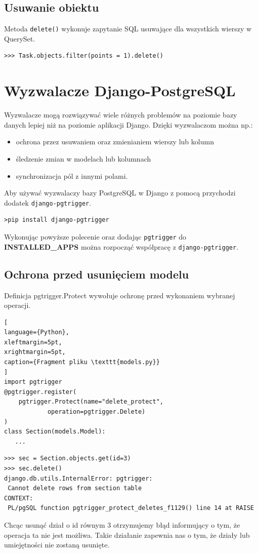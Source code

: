 \documentclass[oneside,polski,logo,indent]{amuthesis}
\begin{document}
\begin{enumerate}
\begin{enumerate}
\subsection{Usuwanie obiektu}
Metoda \texttt{delete()} wykonuje zapytanie SQL usuwające dla wszystkich wierszy w QuerySet.
\begin{lstlisting}[style=DOS]
>>> Task.objects.filter(points = 1).delete()
\end{lstlisting}
\section{Wyzwalacze Django-PostgreSQL}
Wyzwalacze mogą rozwiązywać wiele różnych problemów na poziomie bazy danych lepiej niż na poziomie aplikacji Django. Dzięki wyzwalaczom można np.:
\begin{itemize}
\item ochrona przez usuwaniem oraz zmienianiem wierszy lub kolumn
\item śledzenie zmian w modelach lub kolumnach
\item synchronizacja pól z innymi polami.
\end{itemize}
Aby używać wyzwalaczy bazy PostgreSQL w Django z pomocą przychodzi dodatek \texttt{django-pgtrigger}.
\begin{lstlisting}[style=DOS]
>pip install django-pgtrigger
\end{lstlisting}
Wykonując powyższe polecenie oraz dodając \texttt{pgtrigger} do \textbf{INSTALLED\_APPS} można rozpocząć współpracę z \texttt{django-pgtrigger}.
\subsection{Ochrona przed usunięciem modelu}
Definicja pgtrigger.Protect wywołuje ochronę przed wykonaniem wybranej operacji.
\begin{lstlisting}[
language={Python},
xleftmargin=5pt,
xrightmargin=5pt,
caption={Fragment pliku \texttt{models.py}}
]
import pgtrigger
@pgtrigger.register(
	pgtrigger.Protect(name="delete_protect",
			operation=pgtrigger.Delete)
)
class Section(models.Model):
   ...
\end{lstlisting}
\begin{lstlisting}[style=DOS]
>>> sec = Section.objects.get(id=3)
>>> sec.delete()
django.db.utils.InternalError: pgtrigger: 
 Cannot delete rows from section table
CONTEXT:  
 PL/pgSQL function pgtrigger_protect_deletes_f1129() line 14 at RAISE
\end{lstlisting}
Chcąc usunąć dział o id równym 3 otrzymujemy błąd informujący o tym, że operacja ta nie jest możliwa. Takie działanie zapewnia nas o tym, że działy lub umiejętności nie zostaną usunięte.

\end{enumerate}
\end{enumerate}
\end{document}
